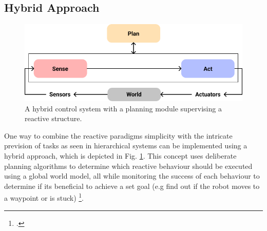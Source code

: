 \subsection{Hybrid Approach}

\begin{figure}
	\centering
	\includegraphics[width=0.9\linewidth]{img/hybrid}
	\caption{
		A hybrid control system with a planning module supervising a reactive structure. 
	}
	\label{fig:hybridApproach}
\end{figure}


One way to combine the reactive paradigms simplicity with the intricate prevision of tasks as seen in hierarchical systems can be implemented using a hybrid approach, which is depicted in Fig. \ref{fig:hybridApproach}. 
This concept uses deliberate planning algorithms to determine which reactive behaviour should be executed using a global world model, all while monitoring the success of each behaviour to determine if its beneficial to achieve a set goal (e.g find out if the robot moves to a waypoint or is stuck) \footcite{faigl2017controlParadigms}.

